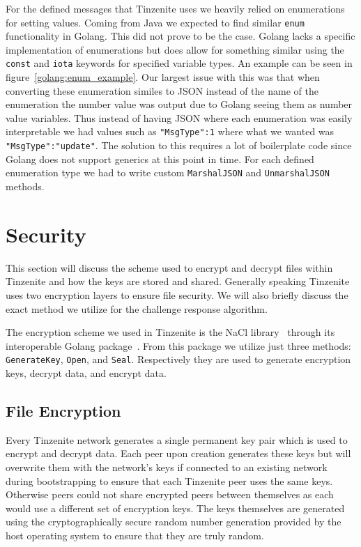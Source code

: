 For the defined messages that Tinzenite uses we heavily relied on enumerations for setting values.
Coming from Java we expected to find similar \texttt{enum} functionality in Golang.
This did not prove to be the case.
Golang lacks a specific implementation of enumerations but does allow for something similar using the \texttt{const} and \texttt{iota} keywords for specified variable types.
An example can be seen in figure~\ref{golang:enum_example}.
Our largest issue with this was that when converting these enumeration similes to JSON instead of the name of the enumeration the number value was output due to Golang seeing them as number value variables.
Thus instead of having JSON where each enumeration was easily interpretable we had values such as \texttt{"MsgType":1} where what we wanted was \texttt{"MsgType":"update"}.
The solution to this requires a lot of boilerplate code since Golang does not support generics at this point in time.
For each defined enumeration type we had to write custom \texttt{MarshalJSON} and \texttt{UnmarshalJSON} methods.

\section{Security}
\label{sec:Security}

This section will discuss the scheme used to encrypt and decrypt files within Tinzenite and how the keys are stored and shared.
Generally speaking Tinzenite uses two encryption layers to ensure file security.
We will also briefly discuss the exact method we utilize for the challenge response algorithm.

The encryption scheme we used in Tinzenite is the NaCl library~\cite{bernstein2012security} through its interoperable Golang package~\cite{web:site:golang:box}.%
From this package we utilize just three methods: \texttt{GenerateKey}, \texttt{Open}, and \texttt{Seal}.
Respectively they are used to generate encryption keys, decrypt data, and encrypt data.

\subsection{File Encryption}
\label{sub:File Encryption}

Every Tinzenite network generates a single permanent key pair which is used to encrypt and decrypt data.
Each peer upon creation generates these keys but will overwrite them with the network's keys if connected to an existing network during bootstrapping to ensure that each Tinzenite peer uses the same keys.
Otherwise peers could not share encrypted peers between themselves as each would use a different set of encryption keys.
The keys themselves are generated using the cryptographically secure random number generation provided by the host operating system to ensure that they are truly random.

